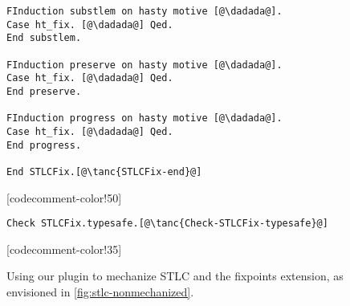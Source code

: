 \begin{figure}
\begin{minipage}{\textwidth}
\begin{multicols}{2}
\begin{lstlisting}[firstnumber=77]
FInduction substlem on hasty motive [@\dadada@].
Case ht_fix. [@\dadada@] Qed.
End substlem.

FInduction preserve on hasty motive [@\dadada@].
Case ht_fix. [@\dadada@] Qed.
End preserve.

FInduction progress on hasty motive [@\dadada@].
Case ht_fix. [@\dadada@] Qed.
End progress.

End STLCFix.[@\tanc{STLCFix-end}@]
\end{lstlisting}

[codecomment-color!50]

\vspace{-8pt}


\begin{lstlisting}[firstnumber=111]
Check STLCFix.typesafe.[@\tanc{Check-STLCFix-typesafe}@]
\end{lstlisting}

[codecomment-color!35]

\end{multicols}
\end{minipage}
\caption{Using our plugin to mechanize STLC and the fixpoints extension,
as envisioned in \cref{fig:stlc-nonmechanized}.}
\label{fig:stlc-mechanized}
\end{figure}




\ifShowOldWriting

